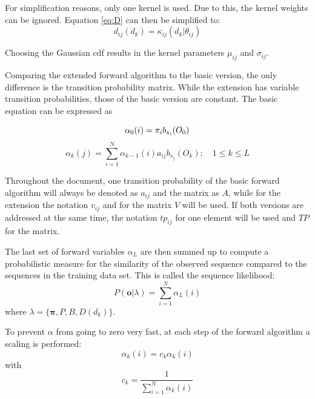 \documentclass[mscthesis]{usiinfthesis}
\begin{document}
For simplification reasons, only one kernel is used. Due to this, the kernel
weights can be ignored. Equation \ref{eq:D} can then be simplified to:
\begin{equation}
    \label{eq:D_fact}
    d_{ij}(d_k) = \kappa_{ij}(d_k | \theta_{ij})
\end{equation}

Choosing the Gaussian \gls{cdf} results in the kernel parameters
$ \mu_{ij} $ and $ \sigma_{ij} $.

Comparing the extended forward algorithm to the basic version, the only
difference is the transition probability matrix. While the extension has
variable transition probabilities, those of the basic version are constant. The
basic equation can be expressed as

\begin{equation}
    \label{eq:forward_init_basic}
    \alpha_0(i) = \pi_{i}b_{s_i}(O_0) \\
\end{equation}
\begin{equation}
    \label{eq:forward_basic}
    \alpha_k(j) = \sum_{i=1}^{N} \alpha_{k-1}(i) a_{ij} b_{s_j}(O_k);
    \quad 1 \leq k \leq L
\end{equation}

Throughout the document, one transition probability of the basic forward
algorithm will always be denoted as $a_{ij}$ and the matrix as $A$, while for
the extension the notation $v_{ij}$ and for the matrix $V$ will be used. If
both versions are addressed at the same time, the notation $tp_{ij}$ for one
element will be used and $TP$ for the matrix.

The last set of forward variables $ \alpha_L $ are then summed up to compute
a probabilistic measure for the similarity of the observed sequence compared to
the sequences in the training data set. This is called the sequence likelihood:
\begin{equation}
    \label{eq:P}
    P(\boldsymbol{o}|\lambda) = \sum\limits_{i=1}^{N} \alpha_L(i)
\end{equation}
where $ \lambda = \{\boldsymbol{\pi}, P, B, D(d_k) \} $.

To prevent $ \alpha $ from going to zero very fast, at each step of the forward
algorithm a scaling is performed:
\begin{equation}
    \label{eq:scaled}
    \alpha_k(i) = c_k \alpha_k(i)
\end{equation}
with
\begin{equation}
    \label{eq:scaling_factor}
    c_k = \frac{1}{\sum\limits_{i=1}^{N} \alpha_k(i)}
\end{equation}
\end{document}
